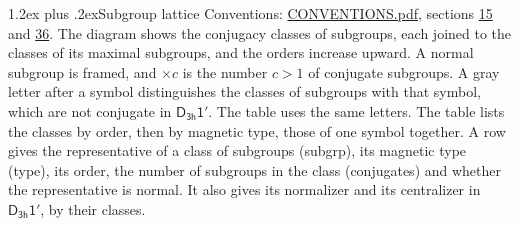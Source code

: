 \documentclass[10pt,a4paper]{article}
\makeatletter
\renewcommand\section{\@startsection{section}{1}{\z@}{-3ex plus -1ex minus -.2ex}%
  {1.2ex plus .2ex}{\normalfont\large\sffamily\bfseries\color{parttitle}}}
\numberwithin{equation}{section}
\newcommand{\grp}[1]{\mathsf{#1}}
\makeatother
\begin{document}
\section{Subgroup lattice}\label{s:subgroups}
Conventions: \href{../../CONVENTIONS.pdf}{CONVENTIONS.pdf}, sections \href{../../../rotation/CONVENTIONS.pdf\#conv.15}{15} and \href{../../CONVENTIONS.pdf\#conv.36}{36}.
The diagram shows the conjugacy classes of subgroups, each joined to the classes of its maximal subgroups, and the orders increase upward. \label{n:index.conjugates.c}\label{n:mark.conjugates}A normal subgroup is framed, and ${\times}c$ is the number $c > 1$ of conjugate subgroups. \label{n:mark.letter}A gray letter after a symbol distinguishes the classes of subgroups with that symbol, which are not conjugate in $\grp{D_{3h}1'}$. The table uses the same letters. The table lists the classes by order, then by magnetic type, those of one symbol together. \label{n:head.subgroup}\label{n:head.magnetic.type}\label{n:head.order}\label{n:head.conjugates}\label{n:head.normal}A row gives the representative of a class of subgroups (subgrp), its magnetic type (type), its order, the number of subgroups in the class (conjugates) and whether the representative is normal. \label{n:head.normalizer}\label{n:head.centralizer}It also gives its normalizer and its centralizer in $\grp{D_{3h}1'}$, by their classes. 
\end{document}
